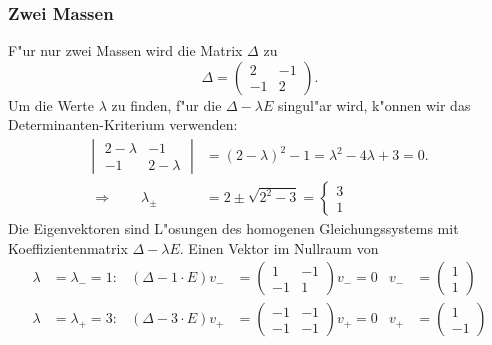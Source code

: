 \subsubsection{Zwei Massen}
F"ur nur zwei Massen wird die Matrix $\Delta$ zu
\[
\Delta=\begin{pmatrix}
2&-1\\
-1&2
\end{pmatrix}.
\]
Um die Werte $\lambda$ zu finden, f"ur die $\Delta-\lambda E$ singul"ar
wird, k"onnen wir das Determinanten-Kriterium verwenden:
\begin{align*}
\left|\;\begin{matrix}
2-\lambda&-1\\-1&2-\lambda
\end{matrix}\;\right|
&=(2-\lambda)^2-1=\lambda^2 -4\lambda+3=0.
\\
\Rightarrow\qquad
\lambda_{\pm}&=2\pm\sqrt{2^2-3}=\begin{cases}3\\1\end{cases}
\end{align*}
Die Eigenvektoren sind L"osungen des homogenen Gleichungssystems mit
Koeffizientenmatrix $\Delta-\lambda E$. 
Einen Vektor im Nullraum
von
\begin{align*}
\lambda&=\lambda_-=1:&
(\Delta -1\cdot E)v_-&=
\begin{pmatrix}
1&-1\\-1&1
\end{pmatrix}v_-=0
&
v_-&=\begin{pmatrix}1\\1\end{pmatrix}
\\
\lambda&=\lambda_+=3:&
(\Delta -3\cdot E)v_+&=
\begin{pmatrix}
-1&-1\\-1&-1
\end{pmatrix}v_+=0
&
v_+&=\begin{pmatrix}1\\-1\end{pmatrix}
\end{align*}
